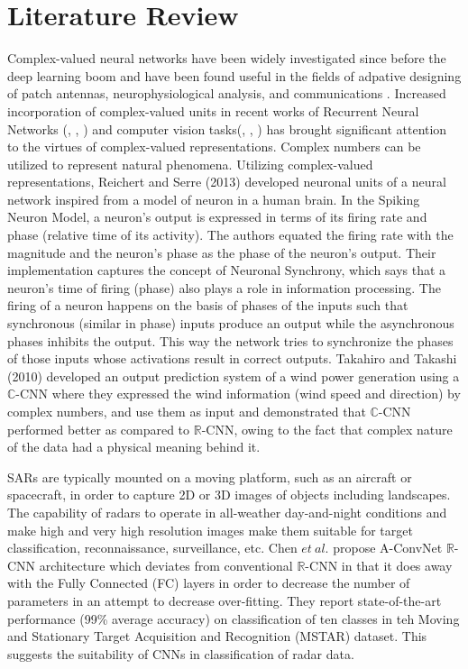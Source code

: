 \chapter{Literature Review}\label{chap:comp}

Complex-valued neural networks have been widely investigated since before the deep learning boom and have been found useful in the fields of adpative designing of patch antennas, neurophysiological analysis, and communications \cite{hirose2012complex}. Increased incorporation of complex-valued units in recent works of Recurrent Neural Networks (\cite{ArjovskySB15}, \cite{wisdom2016full}, \cite{danihelka2016associative}) and computer vision tasks(\cite{oyallon2015deep}, \cite{bruna2015theoretical}, \cite{worrall2017harmonic}) has brought significant attention to the virtues of complex-valued representations. 
Complex numbers can be utilized to represent natural phenomena. Utilizing complex-valued representations, Reichert and Serre (2013) \cite{reichert2013neuronal} developed neuronal units of a neural network inspired from a model of neuron in a human brain. In the Spiking Neuron Model, a neuron's output is expressed in terms of its firing rate and phase (relative time of its activity). The authors equated the firing rate with the magnitude and the neuron's phase as the phase of the neuron's output. Their implementation captures the concept of Neuronal Synchrony, which says that a neuron's time of firing (phase) also plays a role in information processing. The firing of a neuron happens on the basis of phases of the inputs such that synchronous (similar in phase) inputs produce an output while the asynchronous phases inhibits the output. This way the network tries to synchronize the phases of those inputs whose activations result in correct outputs. Takahiro and Takashi (2010) developed an output prediction system of a wind power generation using a $\mathbb{C}$-CNN where they expressed the wind information (wind speed and direction) by complex numbers, and use them as input and demonstrated that $\mathbb{C}$-CNN performed better as compared to $\mathbb{R}$-CNN, owing to the fact that complex nature of the data had a physical meaning behind it.
 
SARs are typically mounted on a moving platform, such as an aircraft or spacecraft, in order to capture 2D or 3D images of objects including landscapes. The capability of radars to operate in all-weather day-and-night conditions and make high and very high resolution images make them suitable for target classification, reconnaissance,
surveillance, etc. 
Chen $et \ al.$ propose A-ConvNet $\mathbb{R}$-CNN architecture which deviates from conventional $\mathbb{R}$-CNN in that it does away with the Fully Connected (FC) layers in order to decrease the number of parameters in an attempt to decrease over-fitting. They report state-of-the-art performance (99\% average accuracy) on classification of ten classes in teh Moving and Stationary Target Acquisition and Recognition (MSTAR) dataset. This suggests the suitability of CNNs in classification of radar data. 


